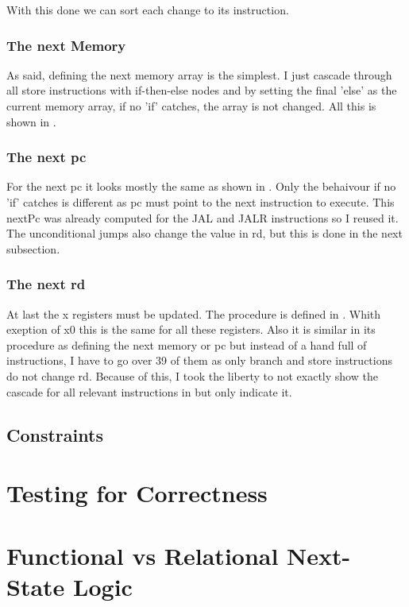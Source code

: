 With this done we can sort each change to its instruction.



\subsubsection{The next Memory}
As said, defining the next memory array is the simplest. I just cascade through
all store instructions with if-then-else nodes and by setting the final 'else'
as the current memory array, if no 'if' catches, the array is not changed. All
this is shown in .



\subsubsection{The next pc}
For the next pc it looks mostly the same as shown in . Only
the behaivour if no 'if' catches is different as pc must point to the next
instruction to execute. This nextPc was already computed for the JAL and JALR
instructions so I reused it. The unconditional jumps also change the value in
rd, but this is done in the next subsection.



\subsubsection{The next rd}
At last the x registers must be updated. The procedure is defined in
. Whith exeption of x0 this is the same for all these
registers. Also it is similar in its procedure as defining the next memory or
pc but instead of a hand full of instructions, I have to go over 39 of them as
only branch and store instructions do not change rd. Because of this, I took
the liberty to not exactly show the cascade for all relevant instructions in
 but only indicate it.



\subsection{Constraints}
\section{Testing for Correctness}\label{sec:corectness}

\section{Functional vs Relational Next-State Logic}\label{sec:funcVSrel}